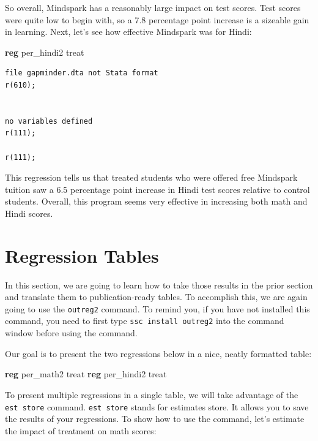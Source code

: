 \documentclass[
]{book}
\newenvironment{Shaded}{\begin{snugshade}}{\end{snugshade}}
\newcommand{\KeywordTok}[1]{\textcolor[rgb]{0.13,0.29,0.53}{\textbf{#1}}}
\newcommand{\NormalTok}[1]{#1}
\begin{document}
So overall, Mindspark has a reasonably large impact on test scores. Test scores were quite low to begin with, so a 7.8 percentage point increase is a sizeable gain in learning. Next, let's see how effective Mindspark was for Hindi:

\begin{Shaded}
\begin{Highlighting}[]
\KeywordTok{reg}\NormalTok{ per\_hindi2 treat}
\end{Highlighting}
\end{Shaded}

\begin{verbatim}
file gapminder.dta not Stata format
r(610);


no variables defined
r(111);

r(111);
\end{verbatim}

This regression tells us that treated students who were offered free Mindspark tuition saw a 6.5 percentage point increase in Hindi test scores relative to control students. Overall, this program seems very effective in increasing both math and Hindi scores.

\section{Regression Tables}\label{regression-tables}

In this section, we are going to learn how to take those results in the prior section and translate them to publication-ready tables. To accomplish this, we are again going to use the \texttt{outreg2} command. To remind you, if you have not installed this command, you need to first type \texttt{ssc\ install\ outreg2} into the command window before using the command.

Our goal is to present the two regressions below in a nice, neatly formatted table:

\begin{Shaded}
\begin{Highlighting}[]
\KeywordTok{reg}\NormalTok{ per\_math2 treat }
\KeywordTok{reg}\NormalTok{ per\_hindi2 treat}
\end{Highlighting}
\end{Shaded}

To present multiple regressions in a single table, we will take advantage of the \texttt{est\ store} command. \texttt{est\ store} stands for estimates store. It allows you to save the results of your regressions. To show how to use the command, let's estimate the impact of treatment on math scores:
\end{document}
